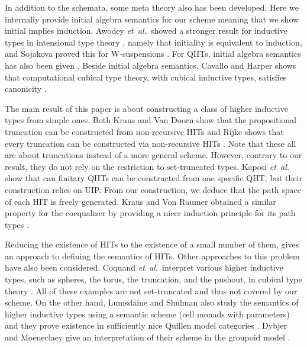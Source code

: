 \documentclass[9pt]{entcs}
\newcommand{\etal}{\emph{et~al.}}
\newcommand{\0}{\textbf{0}} %
\begin{document}
In addition to the schemata, some meta theory also has been developed.
Here we internally provide initial algebra semantics for our scheme meaning that we show initial implies induction.
Awodey \etal \ showed a stronger result for inductive types in intensional type theory \cite{AwodeyGS12,dybjer1994inductive}, namely that initiality is equivalent to induction, and Sojakova proved this for W-suspensions \cite{Sojakova15}.
For QIITs, initial algebra semantics has also been given \cite{AltenkirchCDKF18}.
Beside initial algebra semantics, Cavallo and Harper shows that computational cubical type theory, with cubical inductive types, satisfies canonicity \cite{AngiuliHW17,CavalloH19}.

The main result of this paper is about constructing a class of higher inductive types from simple ones.
Both Kraus and Van Doorn show that the propositional truncation can be constructed from non-recursive HITs \cite{Kraus16,Doorn16} and Rijke shows that every truncation can be constructed via non-recursive HITs \cite{rijke2017join}.
Note that these all are about truncations instead of a more general scheme.
However, contrary to our result, they do not rely on the restriction to set-truncated types.
Kaposi \etal \ \cite{KaposiKA19} show that can finitary QIITs can be constructed from one specific QIIT, but their construction relies on UIP.
From our construction, we deduce that the path space of each HIT is freely generated.
Kraus and Von Raumer obtained a similar property for the coequalizer by providing a nicer induction principle for its path types \cite{KrausRaumer}.

Reducing the existence of HITs to the existence of a small number of them, gives an approach to defining the semantics of HITs.
Other approaches to this problem have also been considered.
Coquand \etal \ interpret various higher inductive types, such as spheres, the torus, the truncation, and the pushout, in cubical type theory \cite{BezemCH13,CohenCHM16,CoquandHM18}.
All of these examples are not set-truncated and thus not covered by our scheme.
On the other hand, Lumsdaine and Shulman also study the semantics of higher inductive types using a semantic scheme (cell monads with parameters) and they prove existence in sufficiently nice Quillen model categories \cite{lumsdaine2017semantics}.
Dybjer and Moeneclaey give an interpretation of their scheme in the groupoid model \cite{DybjerM18,HofmannS94}.
\end{document}
